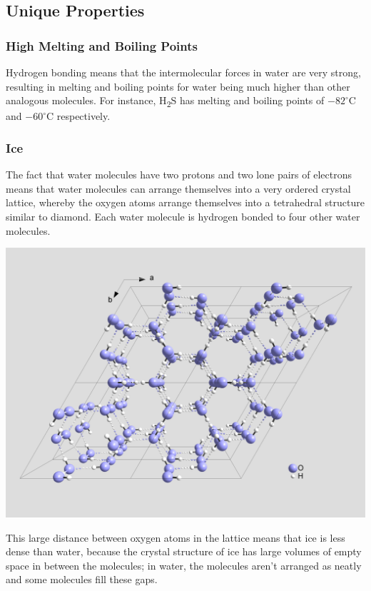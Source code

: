 \documentclass{article}
\newenvironment{Figure}{\par\medskip\noindent\minipage{\linewidth}}{\endminipage\par\medskip}
\begin{document}
\begin{multicols}{2}
\subsection{Unique Properties}
\subsubsection{High Melting and Boiling Points}
Hydrogen bonding means that the intermolecular forces in water are very strong, resulting in melting and boiling points for water being much higher than other analogous molecules. For instance, H\textsubscript{2}S has melting and boiling points of $-82^{\circ}$C and $-60^{\circ}$C respectively.
\subsubsection{Ice}
The fact that water molecules have two protons and two lone pairs of electrons means that water molecules can arrange themselves into a very ordered crystal lattice, whereby the oxygen atoms arrange themselves into a tetrahedral structure similar to diamond. Each water molecule is hydrogen bonded to four other water molecules.

\begin{Figure}
	\includegraphics[width=\textwidth]{figures/Cryst_struct_ice.png}
	\label{fig:Ice}	
\end{Figure}

This large distance between oxygen atoms in the lattice means that ice is less dense than water, because the crystal structure of ice has large volumes of empty space in between the molecules; in water, the molecules aren't arranged as neatly and some molecules fill these gaps.

\end{multicols}
\end{document}

